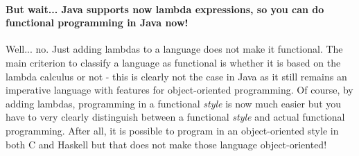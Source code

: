\paragraph{But wait... Java supports now lambda expressions, so you can do functional programming in Java now!} Well... no. Just adding lambdas to a language does not make it functional. The main criterion to classify a language as functional is whether it is based on the lambda calculus or not - this is clearly not the case in Java as it still remains an imperative language with features for object-oriented programming. Of course, by adding lambdas, programming in a functional \textit{style} is now much easier but you have to very clearly distinguish between a functional \textit{style} and actual functional programming. After all, it is possible to program in an object-oriented style in both C and Haskell but that does not make those language object-oriented!
